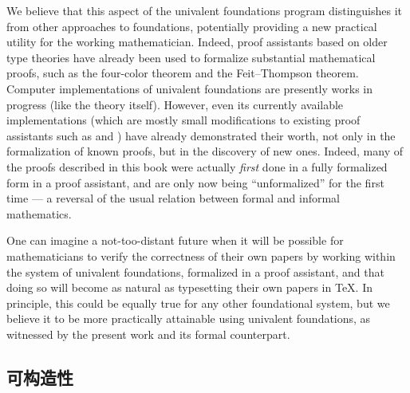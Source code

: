 We believe that this aspect of the univalent foundations program distinguishes it from other approaches to foundations, potentially providing a new practical utility for the working mathematician.
Indeed, proof assistants based on older type theories have already been used to formalize substantial mathematical proofs, such as the four-color theorem  and the Feit--Thompson theorem.
Computer implementations of univalent foundations are presently works in progress (like the theory itself).
%
However, even its currently available implementations (which are mostly small modifications to existing proof assistants such as \Coq and 
\Agda) have already demonstrated their worth, not only in the formalization of known proofs, but in the discovery of new ones.
Indeed, many of the proofs described in this book were actually \emph{first} done in a fully formalized form in a proof assistant, and are only now being ``unformalized'' for the first time --- a reversal of the usual relation between formal and informal mathematics.

One can imagine a not-too-distant future when it will be possible for mathematicians to verify the correctness of their own papers by working within the system of univalent foundations, formalized in a proof assistant, and that doing so will become as natural as typesetting their own papers in \TeX.
In principle, this could be equally true for any other foundational system, but we believe it to be more practically attainable using univalent foundations, as witnessed by the present work and its formal counterpart.

%
%
%
%

\subsection*{可构造性} 

%

